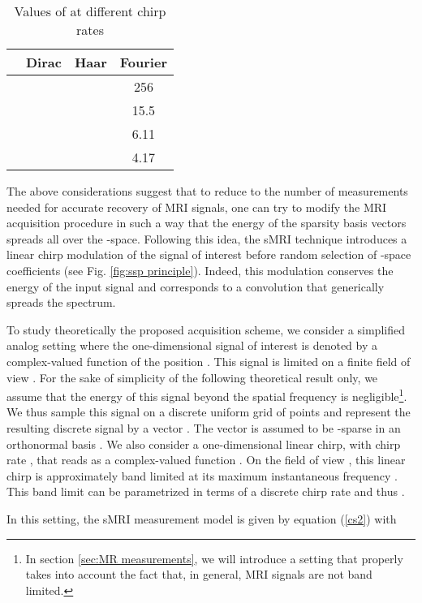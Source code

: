 \documentclass[10pt,draftcls, onecolumn]{IEEEtran}
\begin{document}
\begin{table}
\caption{\label{tab:table Nmu} Values of  at different chirp rates }
\centering
\renewcommand{\arraystretch}{1.05}
\begin{tabular}{c|ccc}
\hline 
 & Dirac & Haar & Fourier \\
\hline\hline
 &  &  & 256 \\
 &  &  & 15.5 \\
 &  &  & 6.11 \\
 &  &  & 4.17 \\
\hline
\end{tabular}
\end{table}


The above considerations suggest that to reduce to the number of measurements needed for accurate recovery of MRI signals, one can try to modify the MRI acquisition procedure in such a way that the energy of the sparsity basis vectors spreads all over the -space. Following this idea, the sMRI technique introduces a linear chirp modulation of the signal of interest before random selection of -space coefficients (see Fig. \ref{fig:ssp principle}). Indeed, this modulation conserves the energy of the input signal and corresponds to a convolution that generically spreads the spectrum. 

To study theoretically the proposed acquisition scheme, we consider a simplified analog setting where the one-dimensional signal of interest is denoted by a complex-valued function  of the position . This signal is limited on a finite field of view . For the sake of simplicity of the following theoretical result only, we assume that the energy of this signal beyond the spatial frequency  is negligible\footnote{In section \ref{sec:MR measurements}, we will introduce a setting that properly takes into account the fact that, in general, MRI signals are not band limited.}. We thus sample this signal on a discrete uniform grid of  points and represent the resulting discrete signal by a vector . The vector  is assumed to be -sparse in an orthonormal basis . We also consider a one-dimensional linear chirp, with chirp rate , that reads as a complex-valued function . On the field of view , this linear chirp is approximately band limited at its maximum instantaneous frequency . This band limit can be parametrized in terms of a discrete chirp rate  and thus . 

In this setting, the sMRI measurement model is given by equation (\ref{cs2}) with
\end{document}
